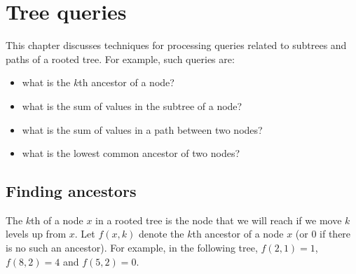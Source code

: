 \chapter{Tree queries}


This chapter discusses techniques for
processing queries related
to subtrees and paths of a rooted tree.
For example, such queries are:

\begin{itemize}
\item what is the $k$th ancestor of a node?
\item what is the sum of values in the subtree of a node?
\item what is the sum of values in a path between two nodes?
\item what is the lowest common ancestor of two nodes?
\end{itemize}

\section{Finding ancestors}


The $k$th  of a node $x$ in a rooted tree
is the node that we will reach if we move $k$
levels up from $x$.
Let $f(x,k)$ denote the $k$th ancestor of a node $x$
(or $0$ if there is no such an ancestor).
For example, in the following tree, $f(2,1)=1$, $f(8,2)=4$
and $f(5,2)=0$.

\begin{center}
\end{center}

